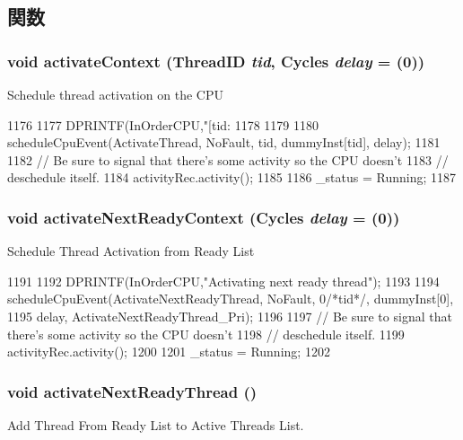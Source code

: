 \subsection{関数}
\hypertarget{classInOrderCPU_ad1c701dd98d725950e539f84f9faa8ec}{
\subsubsection[{activateContext}]{\setlength{\rightskip}{0pt plus 5cm}void activateContext ({\bf ThreadID} {\em tid}, \/  {\bf Cycles} {\em delay} = {(0)})}}
\label{classInOrderCPU_ad1c701dd98d725950e539f84f9faa8ec}
Schedule thread activation on the CPU 


\begin{DoxyCode}
1176 {
1177     DPRINTF(InOrderCPU,"[tid:%
1178 
1179     
1180     scheduleCpuEvent(ActivateThread, NoFault, tid, dummyInst[tid], delay);
1181 
1182     // Be sure to signal that there's some activity so the CPU doesn't
1183     // deschedule itself.
1184     activityRec.activity();
1185 
1186     _status = Running;
1187 }
\end{DoxyCode}
\hypertarget{classInOrderCPU_a067a25ab186d028e9c581a68903f5e32}{
\subsubsection[{activateNextReadyContext}]{\setlength{\rightskip}{0pt plus 5cm}void activateNextReadyContext ({\bf Cycles} {\em delay} = {(0)})}}
\label{classInOrderCPU_a067a25ab186d028e9c581a68903f5e32}
Schedule Thread Activation from Ready List 


\begin{DoxyCode}
1191 {
1192     DPRINTF(InOrderCPU,"Activating next ready thread\n");
1193 
1194     scheduleCpuEvent(ActivateNextReadyThread, NoFault, 0/*tid*/, dummyInst[0], 
1195                      delay, ActivateNextReadyThread_Pri);
1196 
1197     // Be sure to signal that there's some activity so the CPU doesn't
1198     // deschedule itself.
1199     activityRec.activity();
1200 
1201     _status = Running;
1202 }
\end{DoxyCode}
\hypertarget{classInOrderCPU_a74bc9652a3caf0d2554213837f7ddb3f}{
\subsubsection[{activateNextReadyThread}]{\setlength{\rightskip}{0pt plus 5cm}void activateNextReadyThread ()}}
\label{classInOrderCPU_a74bc9652a3caf0d2554213837f7ddb3f}
Add Thread From Ready List to Active Threads List. 


